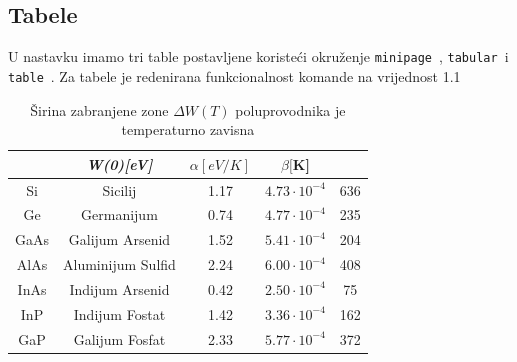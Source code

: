 \documentclass[a4paper,10pt]{article}
\newcommand{\bluetext}[1]
{\texttt{\color{blue}#1}\color{black}~}
\begin{document}
\newpage
\subsection{Tabele}
U nastavku imamo tri table postavljene koristeći okruženje \bluetext{minipage}, \bluetext{tabular}i \bluetext{table}. Za tabele je redenirana funkcionalnost komande {\color{color2}{\verb|\arraystretch{}|}} na vrijednost 1.1
\begin{table}[h]
    \centering{}\small{}
    \begin{tabular}{c c c c c}
        \hline \hline
        \rowcolor[RGB]{77,77,77}\multicolumn{2}{c}{\color{white}Materijal} & \color {white}\textsl{W(0)[eV]} & \color{white}$\alpha[e V / K]$ & \color{white}$\beta[\boldsymbol{K}$]       \\ \hline \hline
        \rowcolor[RGB]{242,242,242} Si                                     & Sicilij                         & 1.17                           & $4.73 \cdot 10^{-4}$                 & 636 \\
        Ge                                                                 & Germanijum                      & 0.74                           & $4.77 \cdot 10^{-4}$                 & 235 \\
        \rowcolor[RGB]{242,242,242} GaAs                                   & Galijum Arsenid                 & 1.52                           & $5.41 \cdot 10^{-4}$                 & 204 \\
        AlAs                                                               & Aluminijum Sulfid               & 2.24                           & $6.00 \cdot 10^{-4}$                 & 408 \\
        \rowcolor[RGB]{242,242,242} InAs                                   & Indijum Arsenid                 & 0.42                           & $2.50 \cdot 10^{-4}$                 & 75  \\
        InP                                                                & Indijum Fostat                  & 1.42                           & $3.36 \cdot 10^{-4}$                 & 162 \\
        \rowcolor[RGB]{242,242,242} GaP                                    & Galijum Fosfat                  & 2.33                           & $5.77 \cdot 10^{-4}$                 & 372 \\\hline \hline
    \end{tabular}
    \caption{Širina zabranjene zone ${\Delta}W(T)$ poluprovodnika je temperaturno zavisna}
    \label{Tabelica:tab1}
\end{table}\\[1mm] \hfill{}
\end{document}
